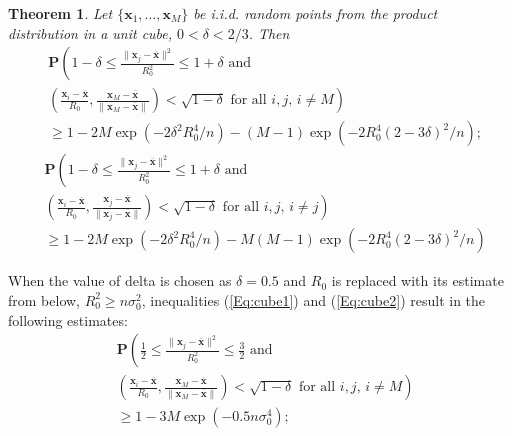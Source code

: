 \documentclass[final,5p,times,twocolumn]{elsarticle}
\newtheorem{theorem}{Theorem}
\begin{document}
\begin{theorem}\label{cube} Let  $\{\boldsymbol{x}_1, \ldots , \boldsymbol{x}_M\}$ be i.i.d. random points  from the product distribution in a unit cube, $0< \delta <2/3$. Then
\begin{equation}\label{Eq:cube1}
\begin{split}
&\mathbf{P}\left(1-\delta  \leq \frac{\|\boldsymbol{x}_j-\overline{\boldsymbol{x}}\|^2}{R^2_0}\leq 1+\delta \mbox{ and } \right. \\
& \left.
\left(\frac{\boldsymbol{x}_i-\overline{\boldsymbol{x}}}{R_0},\frac{\boldsymbol{x}_M-\overline{\boldsymbol{x}}}{\| \boldsymbol{x}_M-\overline{\boldsymbol{x}}\| }\right)<\sqrt{1-\delta} \mbox{ for all } i,j, \, i\neq M \right)\\
&\geq 1- 2M\exp \left(-2\delta^2 R_0^4/n \right) -(M-1)\exp \left(-2R_0^4(2-3 \delta)^2/n\right);
\end{split}
\end{equation}
\begin{equation}\label{Eq:cube2}
\begin{split}
&\mathbf{P}\left(1-\delta  \leq \frac{\|\boldsymbol{x}_j-\overline{\boldsymbol{x}}\|^2}{R^2_0}\leq 1+\delta \mbox{ and } \right. \\
&\left.
\left(\frac{\boldsymbol{x}_i-\overline{\boldsymbol{x}}}{R_0},\frac{\boldsymbol{x}_j-\overline{\boldsymbol{x}}}{\| \boldsymbol{x}_j-\overline{\boldsymbol{x}}\| }\right)<\sqrt{1-\delta} \mbox{ for all } i,j, \, i\neq j \right)\\
&\geq 1- 2M\exp \left(-2\delta^2 R_0^4/n \right) -M(M-1)\exp \left(-2R_0^4(2-3 \delta)^2/n\right)
\end{split}
\end{equation}
\end{theorem}
When the value of delta is chosen as $\delta=0.5$ and $R_0$ is replaced with its estimate from below, $R^2_0\geq n \sigma_0^2$, inequalities  (\ref{Eq:cube1})  and  (\ref{Eq:cube2}) result in the following  estimates:
\begin{equation}\label{Eq:cube3}
\begin{split}
&\mathbf{P}\left(\frac{1}{2}  \leq \frac{\|\boldsymbol{x}_j-\overline{\boldsymbol{x}}\|^2}{R^2_0}\leq \frac{3}{2} \mbox{ and } \right. \\
& \left.
\left(\frac{\boldsymbol{x}_i-\overline{\boldsymbol{x}}}{R_0},\frac{\boldsymbol{x}_M-\overline{\boldsymbol{x}}}{\| \boldsymbol{x}_M-\overline{\boldsymbol{x}}\| }\right)<\sqrt{1-\delta} \mbox{ for all } i,j, \, i\neq M \right)\\
&\geq  1-3M\exp\left(-0.5 n\sigma_0^4 \right);
\end{split}
\end{equation}
\end{document}
